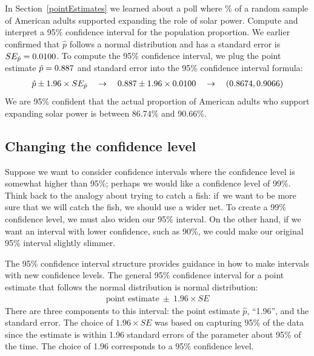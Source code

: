 \begin{example}{In Section~\ref{pointEstimates} we learned about
    a poll where \pewsolarpollpercent{}\% of a random sample of
    \pewsolarpollsize{} American adults
    supported expanding the role of solar power. Compute and
    interpret a 95\% confidence interval for the population
    proportion.} \label{95p_ci_for_pew_solar_support}
  We earlier confirmed that $\hat{p}$ follows a normal
  distribution and has a standard error is
  $SE_{\hat{p}} = 0.0100{}$.
  To compute the 95\% confidence interval, we plug the
  point estimate $\hat{p} = 0.887{}$ and
  standard error into the 95\% confidence interval formula:
  \begin{align*}
  \hat{p} \pm 1.96 \times SE_{\hat{p}}
  \quad\to\quad
  0.887{} \pm 1.96 \times 0.0100{}
  \quad\to\quad
  (0.8674, 0.9066)
  \end{align*}
  We are 95\% confident that the actual proportion of
  American adults who support expanding solar power is
  between 86.74\% and 90.66\%.
\end{example}


\subsection{Changing the confidence level}
\label{changingTheConfidenceLevelSection}


Suppose we want to consider confidence intervals where the confidence
level is somewhat higher than 95\%; perhaps we would like a confidence
level of 99\%. Think back to the analogy about trying to catch a fish:
if~we want to be more sure that we will catch the fish, we should use
a wider net. To create a 99\% confidence level, we must also widen our
95\% interval. On the other hand, if we want an interval with lower
confidence, such as 90\%, we could make our original 95\% interval
slightly slimmer.

The 95\% confidence interval structure provides guidance in how to
make intervals with new confidence levels. The general 95\% confidence
interval for a point estimate that follows the normal distribution is
normal distribution:
\begin{eqnarray}
\text{point estimate}\ \pm\ 1.96\times SE
\end{eqnarray}
There are three components to this interval: the point estimate $\hat{p}$,
``1.96'', and the standard error. The choice of $1.96\times SE$ was
based on capturing 95\% of the data since the estimate is within 1.96
standard errors of the parameter about 95\% of the time.
The choice of 1.96 corresponds to a 95\% confidence level. 

